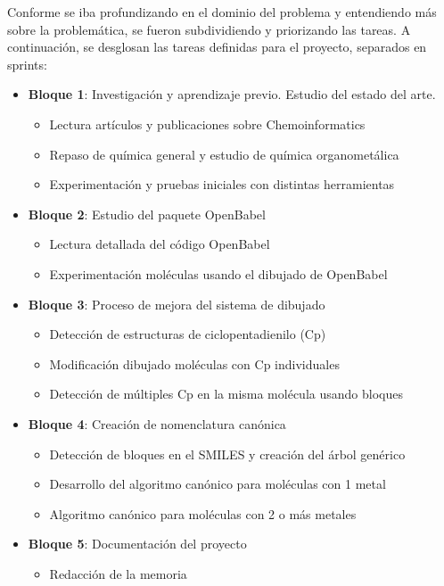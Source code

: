 Conforme se iba profundizando en el dominio del problema y entendiendo más sobre la problemática, se fueron subdividiendo y priorizando las tareas. A continuación, se desglosan las tareas definidas para el proyecto, separados en sprints: 

\begin{itemize}
    \item \textbf{Bloque 1}: Investigación y aprendizaje previo. Estudio del estado del arte.
    \begin{itemize}
        \item Lectura artículos y publicaciones sobre Chemoinformatics
        \item Repaso de química general y estudio de química organometálica
        \item Experimentación y pruebas iniciales con distintas herramientas
    \end{itemize}

    \item \textbf{Bloque 2}: Estudio del paquete OpenBabel
    \begin{itemize}
        \item Lectura detallada del código OpenBabel
        \item Experimentación moléculas usando el dibujado de OpenBabel
    \end{itemize}

    \item \textbf{Bloque 3}: Proceso de mejora del sistema de dibujado
    \begin{itemize}
        \item Detección de estructuras de ciclopentadienilo (Cp)
        \item Modificación dibujado moléculas con Cp individuales
        \item Detección de múltiples Cp en la misma molécula usando bloques
    \end{itemize}

    \item \textbf{Bloque 4}: Creación de nomenclatura canónica
    \begin{itemize}
        \item Detección de bloques en el SMILES y creación del árbol genérico
        \item Desarrollo del algoritmo canónico para moléculas con 1 metal
        \item Algoritmo canónico para moléculas con 2 o más metales
    \end{itemize}

    \item \textbf{Bloque 5}: Documentación del proyecto
    \begin{itemize}
        \item Redacción de la memoria
    \end{itemize}
\end{itemize}


